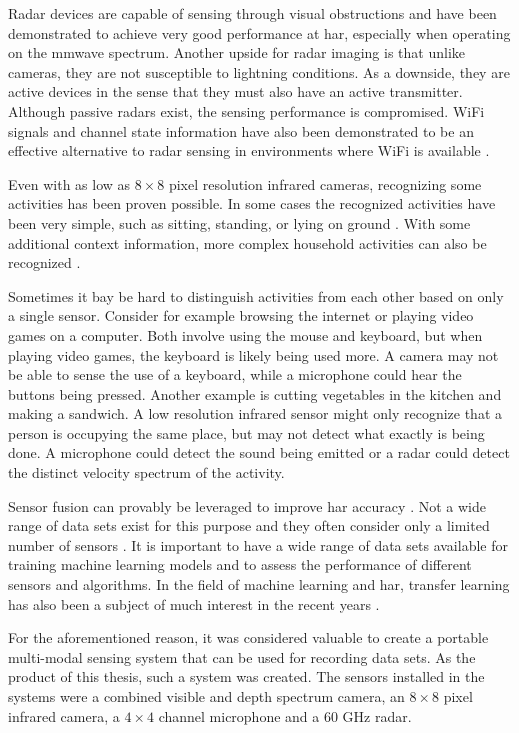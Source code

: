 Radar devices are capable of sensing through visual obstructions
and have been demonstrated to achieve very good performance at \gls{har},
especially when operating on the \gls{mmwave} spectrum.
Another upside for radar imaging is that unlike cameras, 
they are not susceptible to lightning conditions. \cite{radar-survey}
As a downside, they are active devices in the sense that they must also have an active transmitter.
Although passive radars exist, the sensing performance is compromised.
WiFi signals and channel state information have also been demonstrated to be an effective alternative to radar sensing
in environments where WiFi is available \cite{sensing-survey}.

Even with as low as $8 \times 8$ pixel resolution infrared cameras,
recognizing some activities has been proven possible.
In some cases the recognized activities have been very simple,
such as sitting, standing, or lying on ground \cite{ir-simple-activities}.
With some additional context information,
more complex household activities can also be recognized \cite{ir-household}.

Sometimes it bay be hard to distinguish activities from each other based on only a single sensor.
Consider for example browsing the internet or playing video games on a computer.
Both involve using the mouse and keyboard, but when playing video games, the keyboard is likely being used more.
A camera may not be able to sense the use of a keyboard, while a microphone could hear the buttons being pressed.
Another example is cutting vegetables in the kitchen and making a sandwich.
A low resolution infrared sensor might only recognize that a person is occupying the same place,
but may not detect what exactly is being done. A microphone could detect the sound being emitted
or a radar could detect the distinct velocity spectrum of the activity.

Sensor fusion can provably be leveraged to improve \gls{har} accuracy \cite{fusion1, fusion2}.
Not a wide range of data sets exist for this purpose and they often consider only a limited number of sensors \cite{sensing-survey}.
It is important to have a wide range of data sets available for training machine learning models
and to assess the performance of different sensors and algorithms.
In the field of machine learning and \gls{har}, transfer learning has also been a subject of much interest in the recent years \cite{transfer}.

For the aforementioned reason,
it was considered valuable to create a portable multi-modal sensing system that can be used for recording data sets.
As the product of this thesis, such a system was created.
The sensors installed in the systems were a combined visible and depth spectrum camera,
an $8 \times 8$ pixel infrared camera, a $4 \times 4$ channel microphone and a 60 GHz radar.


